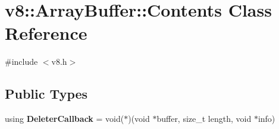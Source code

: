 \hypertarget{classv8_1_1ArrayBuffer_1_1Contents}{}\section{v8\+:\+:Array\+Buffer\+:\+:Contents Class Reference}
\label{classv8_1_1ArrayBuffer_1_1Contents}


{\ttfamily \#include $<$v8.\+h$>$}

\subsection*{Public Types}
\begin{DoxyCompactItemize}
\item 
\mbox{\label{classv8_1_1ArrayBuffer_1_1Contents_aee13ae166dcf8e210c499a81720b436d}} 
using {\bfseries Deleter\+Callback} = void($\ast$)(void $\ast$buffer, size\+\_\+t length, void $\ast$info)
\end{DoxyCompactItemize}
